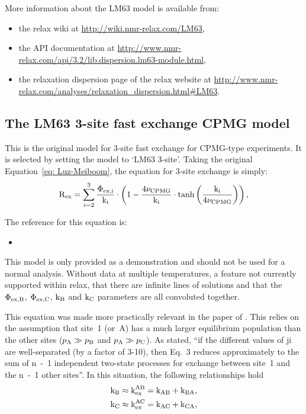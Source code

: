 More information about the LM63 model is available from:
\begin{itemize}
  \item the relax wiki at \url{http://wiki.nmr-relax.com/LM63},
  \item the API documentation at \url{http://www.nmr-relax.com/api/3.2/lib.dispersion.lm63-module.html},
  \item the relaxation dispersion page of the relax website at \url{http://www.nmr-relax.com/analyses/relaxation\_dispersion.html#LM63}.
\end{itemize}



\subsection{The LM63 3-site fast exchange CPMG model}
\label{sect: dispersion: LM63 3-site model}

This is the original \citet{LuzMeiboom63} model for 3-site fast exchange for CPMG-type experiments.
It is selected by setting the model to `LM63 3-site'.
Taking the original Equation~\ref{eq: Luz-Meiboom}, the equation for 3-site exchange is simply:
\begin{equation}
    \mathrm{R}_{\textrm{ex}} = \sum_{i=2}^3 \frac{\Phi_{\textrm{ex,i}}}{\textrm{k}_\textrm{i}} \cdot \left( 1 - \frac{4\nu_{\textrm{CPMG}}}{\textrm{k}_\textrm{i}} \cdot \tanh \left( \frac{\textrm{k}_\textrm{i}}{4\nu_{\textrm{CPMG}}} \right) \right) ,
\end{equation}

The reference for this equation is:
\begin{itemize}
  \item {}
\end{itemize}

This model is only provided as a demonstration and should not be used for a normal analysis.
Without data at multiple temperatures, a feature not currently supported within relax, that there are infinite lines of solutions and that the $\Phi_{\textrm{ex,B}}$, $\Phi_{\textrm{ex,C}}$, $\textrm{k}_{\textrm{B}}$ and $\textrm{k}_{\textrm{C}}$ parameters are all convoluted together.

This equation was made more practically relevant in the paper of \citet{OConnell09}.
This relies on the assumption that site~1 (or~A) has a much larger equilibrium population than the other sites ($p_{\textrm{A}} \gg p_{\textrm{B}}$ and $p_{\textrm{A}} \gg p_{\textrm{C}}$).
As stated, ``if the different values of ji are well-separated (by a factor of 3-10), then Eq.~3 reduces approximately to the sum of n~-~1 independent two-state processes for exchange between site~1 and the n~-~1 other sites''.
In this situation, the following relationships hold
\begin{subequations}
\begin{align}
    &\textrm{k}_{\textrm{B}} \approx \textrm{k}_{\textrm{ex}}^{\textrm{AB}} = \textrm{k}_{\textrm{AB}} + \textrm{k}_{\textrm{BA}} , \\
    &\textrm{k}_{\textrm{C}} \approx \textrm{k}_{\textrm{ex}}^{\textrm{AC}} = \textrm{k}_{\textrm{AC}} + \textrm{k}_{\textrm{CA}} ,
\end{align}
\end{subequations}

